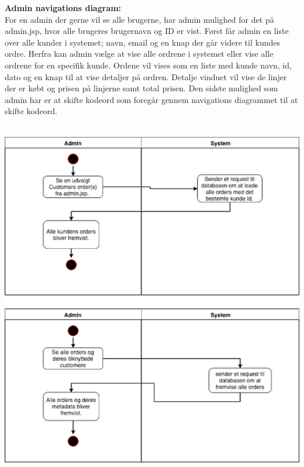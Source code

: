 \documentclass[11pt]{report}
\begin{document}
\noindent
\textbf{Admin navigations diagram:}\\
For en admin der gerne vil se alle brugerne, har admin mulighed for det på admin.jsp, hvor alle brugeres brugernavn og ID er vist. Først får admin en liste over alle kunder i systemet; navn, email og en knap der går videre til kundes ordre. Herfra kan admin vælge at vise alle ordrene i systemet eller vise alle ordrene for en specifik kunde. Ordene vil vises som en liste med kunde navn, id, dato og en knap til at vise detaljer på ordren. Detalje vinduet vil vise de linjer der er købt og prisen på linjerne samt total prisen. Den sidste mulighed som admin har er at skifte kodeord som foregår gennem navigations diagrammet til at skifte kodeord.\\\\
\begin{center}
\includegraphics[width=15cm]{Admin.png}
\end{center}
\newpage
\end{document}
